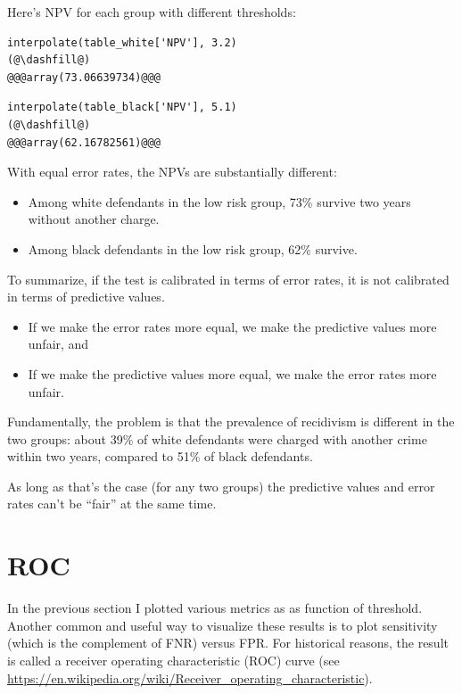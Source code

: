 Here's NPV for each group with different thresholds:

\begin{lstlisting}[]
interpolate(table_white['NPV'], 3.2)
(@\dashfill@)
@@@array(73.06639734)@@@
\end{lstlisting}

\begin{lstlisting}[]
interpolate(table_black['NPV'], 5.1)
(@\dashfill@)
@@@array(62.16782561)@@@
\end{lstlisting}

With equal error rates, the NPVs are substantially different:

\begin{itemize}
\item
  Among white defendants in the low risk group, 73\% survive two years
  without another charge.
\item
  Among black defendants in the low risk group, 62\% survive.
\end{itemize}

To summarize, if the test is calibrated in terms of error rates, it is
not calibrated in terms of predictive values.

\begin{itemize}
\item
  If we make the error rates more equal, we make the predictive values
  more unfair, and
\item
  If we make the predictive values more equal, we make the error rates
  more unfair.
\end{itemize}

Fundamentally, the problem is that the prevalence of recidivism is
different in the two groups: about 39\% of white defendants were charged
with another crime within two years, compared to 51\% of black
defendants.

As long as that's the case (for any two groups) the predictive values
and error rates can't be ``fair'' at the same time.

\hypertarget{roc}{%
\section{ROC}\label{roc}}

In the previous section I plotted various metrics as as function of
threshold. Another common and useful way to visualize these results is
to plot sensitivity (which is the complement of FNR) versus FPR. For
historical reasons, the result is called a receiver operating
characteristic (ROC) curve (see
\url{https://en.wikipedia.org/wiki/Receiver_operating_characteristic}).

